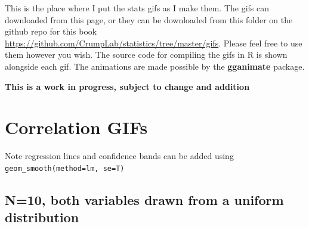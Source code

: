 \documentclass[
  letterpaper,
  DIV=11,
  numbers=noendperiod]{scrreprt}
\begin{document}
This is the place where I put the stats gifs as I make them. The gifs
can downloaded from this page, or they can be downloaded from this
folder on the github repo for this book
\url{https://github.com/CrumpLab/statistics/tree/master/gifs}. Please
feel free to use them however you wish. The source code for compiling
the gifs in R is shown alongside each gif. The animations are made
possible by the \textbf{gganimate} package.

\textbf{This is a work in progress, subject to change and addition}

\section{Correlation GIFs}\label{correlation-gifs}

Note regression lines and confidence bands can be added using
\texttt{geom\_smooth(method=lm,\ se=T)}

\subsection{N=10, both variables drawn from a uniform
distribution}\label{n10-both-variables-drawn-from-a-uniform-distribution}
\end{document}
